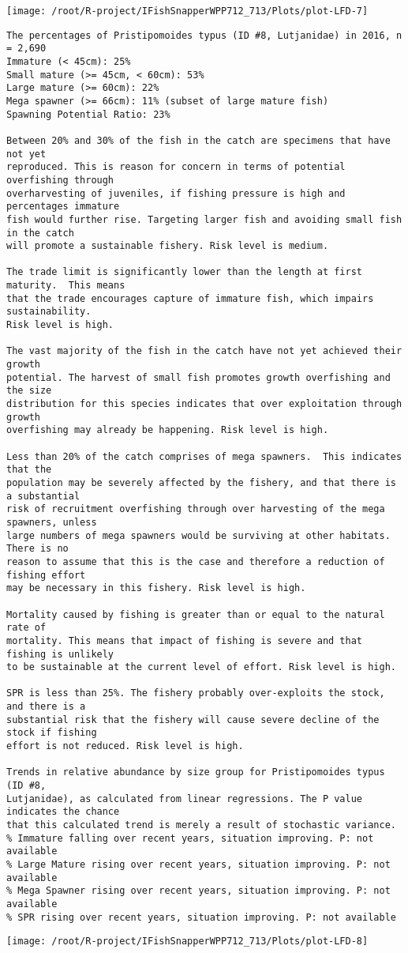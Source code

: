 \documentclass{report}\usepackage[]{graphicx}\usepackage[]{color}
\makeatletter
\def\maxwidth{ %
  \ifdim\Gin@nat@width>\linewidth
    \linewidth
  \else
    \Gin@nat@width
  \fi
}
\newenvironment{kframe}{%
 \def\at@end@of@kframe{}%
 \ifinner\ifhmode%
  \def\at@end@of@kframe{\end{minipage}}%
  \begin{minipage}{\columnwidth}%
 \fi\fi%
 \def\FrameCommand##1{\hskip\@totalleftmargin \hskip-\fboxsep
 \colorbox{shadecolor}{##1}\hskip-\fboxsep
     \hskip-\linewidth \hskip-\@totalleftmargin \hskip\columnwidth}%
 \MakeFramed {\advance\hsize-\width
   \@totalleftmargin\z@ \linewidth\hsize
   \@setminipage}}%
 {\par\unskip\endMakeFramed%
 \at@end@of@kframe}
\newenvironment{knitrout}{}{} %
\makeatother
\begin{document}
\begin{knitrout}
\texttt{[image: /root/R-project/IFishSnapperWPP712\_713/Plots/plot-LFD-7]} 
\begin{kframe}\begin{verbatim}
The percentages of Pristipomoides typus (ID #8, Lutjanidae) in 2016, n = 2,690
Immature (< 45cm): 25%
Small mature (>= 45cm, < 60cm): 53%
Large mature (>= 60cm): 22%
Mega spawner (>= 66cm): 11% (subset of large mature fish)
Spawning Potential Ratio: 23%
 
Between 20% and 30% of the fish in the catch are specimens that have not yet
reproduced. This is reason for concern in terms of potential overfishing through
overharvesting of juveniles, if fishing pressure is high and percentages immature
fish would further rise. Targeting larger fish and avoiding small fish in the catch
will promote a sustainable fishery. Risk level is medium.

The trade limit is significantly lower than the length at first maturity.  This means
that the trade encourages capture of immature fish, which impairs sustainability.
Risk level is high.

The vast majority of the fish in the catch have not yet achieved their growth
potential. The harvest of small fish promotes growth overfishing and the size
distribution for this species indicates that over exploitation through growth
overfishing may already be happening. Risk level is high.

Less than 20% of the catch comprises of mega spawners.  This indicates that the
population may be severely affected by the fishery, and that there is a substantial
risk of recruitment overfishing through over harvesting of the mega spawners, unless
large numbers of mega spawners would be surviving at other habitats. There is no
reason to assume that this is the case and therefore a reduction of fishing effort
may be necessary in this fishery. Risk level is high.
 
Mortality caused by fishing is greater than or equal to the natural rate of
mortality. This means that impact of fishing is severe and that fishing is unlikely
to be sustainable at the current level of effort. Risk level is high.
 
SPR is less than 25%. The fishery probably over-exploits the stock, and there is a
substantial risk that the fishery will cause severe decline of the stock if fishing
effort is not reduced. Risk level is high.
 
Trends in relative abundance by size group for Pristipomoides typus (ID #8,
Lutjanidae), as calculated from linear regressions. The P value indicates the chance
that this calculated trend is merely a result of stochastic variance.
% Immature falling over recent years, situation improving. P: not available
% Large Mature rising over recent years, situation improving. P: not available
% Mega Spawner rising over recent years, situation improving. P: not available
% SPR rising over recent years, situation improving. P: not available
\end{verbatim}
\end{kframe}
\texttt{[image: /root/R-project/IFishSnapperWPP712\_713/Plots/plot-LFD-8]} 
\begin{kframe}


\end{kframe}
\end{knitrout}
\end{document}
